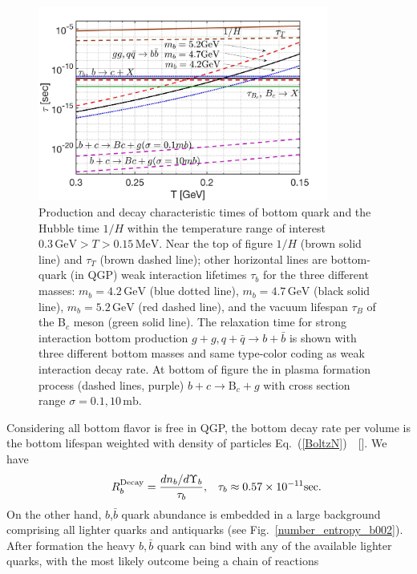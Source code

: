 \begin{figure}[ht]
\begin{center}
\includegraphics[width=0.85\textwidth]{./plots/BQuarkReactionTime003}
\caption{Production and decay characteristic times of bottom quark and the Hubble time $1/H$ within the temperature range of interest  $ 0.3\,\mathrm{GeV}>T> 0.15\,\mathrm{MeV}$. Near the top of figure  $1/H$ (brown solid line) and $\tau_T$ (brown dashed line); other horizontal lines are bottom-quark (in QGP) weak interaction lifetimes $\tau_b$ for the three different masses: $m_b=4.2\,\mathrm{GeV}$ (blue dotted line), $m_b=4.7\,\mathrm{GeV}$ (black solid  line), $m_b=5.2\,\mathrm{GeV}$ (red dashed line), and the vacuum lifespan $\tau_B$ of the  B$_c$ meson (green solid  line). The relaxation time for strong interaction bottom production $g+g, q+\bar q\rightarrow b+\bar{b}$ is shown with three different bottom masses and same type-color coding as weak interaction decay rate. At bottom of figure the in plasma formation process (dashed lines, purple) $b+c\rightarrow \mathrm{B}_c+g$ with cross section range $\sigma=0.1,10\,\mathrm{mb}$.}
\label{ReactionTime}
\end{center}
\end{figure}
Considering all bottom flavor is free in QGP, the bottom decay rate per volume is the bottom lifespan weighted with density of particles Eq.~(\ref{BoltzN})~~[\cite{Kuznetsova:2008jt}]. We have
\begin{align}\hspace{0.5cm}
R^{\mathrm{Decay}}_b=\frac{dn_b/d\Upsilon_b}{\tau_b},\,\,\,\,\, \tau_b\approx0.57\times10^{-11} \mathrm{sec}.
\end{align}
On the other hand, $b$,$\bar b$ quark abundance is embedded in a large background comprising all lighter quarks and antiquarks (see Fig.~\ref{number_entropy_b002}). After formation the heavy $b, \bar b$ quark can bind with any of the available lighter quarks, with the most likely outcome being a chain of reactions 
